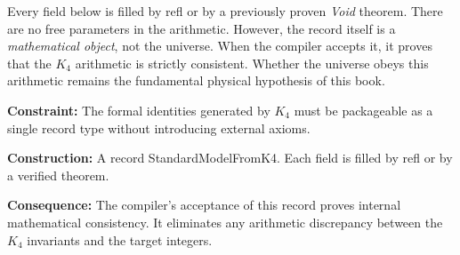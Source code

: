 \documentclass[11pt,a4paper]{book}
\def\texttt#1{#1}%
\begin{document}
Every field below is filled by \texttt{refl} or by a previously proven \textit{Void} theorem. There are no free parameters in the arithmetic. However, the record itself is a \emph{mathematical object}, not the universe. When the compiler accepts it, it proves that the $K_4$ arithmetic is strictly consistent. Whether the universe obeys this arithmetic remains the fundamental physical hypothesis of this book.

\textbf{Constraint:} The formal identities generated by $K_4$ must be packageable as a single record type without introducing external axioms.

\textbf{Construction:} A record \texttt{StandardModelFromK4}. Each field is filled by \texttt{refl} or by a verified theorem. 

\textbf{Consequence:} The compiler's acceptance of this record proves internal mathematical consistency. It eliminates any arithmetic discrepancy between the $K_4$ invariants and the target integers.
\end{document}
